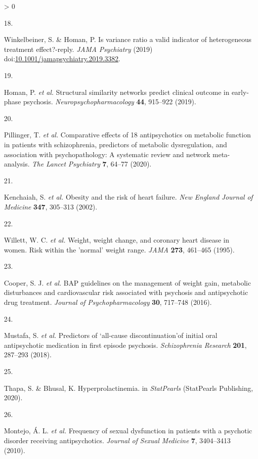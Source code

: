 \documentclass[
  9pt,
  english,
  ,jou,floatsintext]{apa6}
\newlength{\cslhangindent}
\newlength{\csllabelwidth}
\newenvironment{CSLReferences}[2] %
 {%
  \setlength{\parindent}{0pt}
  \ifodd #1 \everypar{\setlength{\hangindent}{\cslhangindent}}\ignorespaces\fi
  \ifnum #2 > 0
  \setlength{\parskip}{#2\baselineskip}
  \fi
 }%
 {}
\newcommand{\CSLLeftMargin}[1]{\parbox[t]{\csllabelwidth}{#1}}
\newcommand{\CSLRightInline}[1]{\parbox[t]{\linewidth - \csllabelwidth}{#1}\break}
\begin{document}
\begin{CSLReferences}{0}{0}
\leavevmode\hypertarget{ref-Winkelbeiner2019b}{}%
\CSLLeftMargin{18. }
\CSLRightInline{Winkelbeiner, S. \& Homan, P. Is variance ratio a valid indicator of heterogeneous treatment effect?-reply. \emph{JAMA Psychiatry} (2019) doi:\href{https://doi.org/10.1001/jamapsychiatry.2019.3382}{10.1001/jamapsychiatry.2019.3382}.}

\leavevmode\hypertarget{ref-Homan2019a}{}%
\CSLLeftMargin{19. }
\CSLRightInline{Homan, P. \emph{et al.} Structural similarity networks predict clinical outcome in early-phase psychosis. \emph{Neuropsychopharmacology} \textbf{44}, 915--922 (2019).}

\leavevmode\hypertarget{ref-Pillinger2020}{}%
\CSLLeftMargin{20. }
\CSLRightInline{Pillinger, T. \emph{et al.} Comparative effects of 18 antipsychotics on metabolic function in patients with schizophrenia, predictors of metabolic dysregulation, and association with psychopathology: A systematic review and network meta-analysis. \emph{The Lancet Psychiatry} \textbf{7}, 64--77 (2020).}

\leavevmode\hypertarget{ref-Kenchaiah2002}{}%
\CSLLeftMargin{21. }
\CSLRightInline{Kenchaiah, S. \emph{et al.} Obesity and the risk of heart failure. \emph{New England Journal of Medicine} \textbf{347}, 305--313 (2002).}

\leavevmode\hypertarget{ref-Willett1995}{}%
\CSLLeftMargin{22. }
\CSLRightInline{Willett, W. C. \emph{et al.} Weight, weight change, and coronary heart disease in women. {Risk} within the 'normal' weight range. \emph{JAMA} \textbf{273}, 461--465 (1995).}

\leavevmode\hypertarget{ref-Cooper2016}{}%
\CSLLeftMargin{23. }
\CSLRightInline{Cooper, S. J. \emph{et al.} {BAP} guidelines on the management of weight gain, metabolic disturbances and cardiovascular risk associated with psychosis and antipsychotic drug treatment. \emph{Journal of Psychopharmacology} \textbf{30}, 717--748 (2016).}

\leavevmode\hypertarget{ref-Mustafa2018}{}%
\CSLLeftMargin{24. }
\CSLRightInline{Mustafa, S. \emph{et al.} Predictors of `all-cause discontinuation'of initial oral antipsychotic medication in first episode psychosis. \emph{Schizophrenia Research} \textbf{201}, 287--293 (2018).}

\leavevmode\hypertarget{ref-Thapa2020}{}%
\CSLLeftMargin{25. }
\CSLRightInline{Thapa, S. \& Bhusal, K. Hyperprolactinemia. in \emph{StatPearls} (StatPearls Publishing, 2020).}

\leavevmode\hypertarget{ref-Montejo2010}{}%
\CSLLeftMargin{26. }
\CSLRightInline{Montejo, Á. L. \emph{et al.} Frequency of sexual dysfunction in patients with a psychotic disorder receiving antipsychotics. \emph{{Journal of Sexual Medicine}} \textbf{7}, 3404--3413 (2010).}


\end{CSLReferences}
\end{document}
